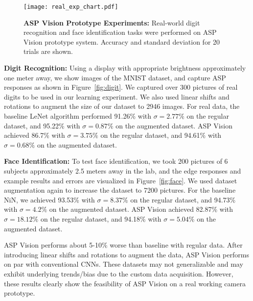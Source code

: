\documentclass[10pt,twocolumn,letterpaper]{article}
\begin{document}
\begin{figure}[t]
\begin{center}
   \texttt{[image: real\_exp\_chart.pdf]}
\end{center}
   \caption{\textbf{ASP Vision Prototype Experiments:} Real-world digit recognition and face identification tasks were performed on ASP Vision prototype system. Accuracy and standard deviation for 20 trials are shown.}
\label{fig:realresults}
\end{figure}\textbf{Digit Recognition:} Using a display with appropriate brightness approximately one meter away, we show images of the MNIST dataset, and capture ASP responses as shown in Figure~\ref{fig:digit}. We captured over 300 pictures of real digits to be used in our learning experiment. We also used linear shifts and rotations to augment the size of our dataset to 2946 images. For real data, the baseline LeNet algorithm performed 91.26\% with $\sigma = 2.77\%$ on the regular dataset, and 95.22\% with $\sigma = 0.87\%$ on the augmented dataset. ASP Vision achieved 86.7\% with $\sigma = 3.75\%$ on the regular dataset, and 94.61\% with $\sigma = 0.68\%$ on the augmented dataset.

\textbf{Face Identification:} To test face identification, we took 200 pictures of 6 subjects approximately 2.5 meters away in the lab, and the edge responses and example results and errors are visualized in Figure~\ref{fig:face}. We used dataset augmentation again to increase the dataset to 7200 pictures. For the baseline NiN, we achieved 93.53\% with $\sigma = 8.37\%$ on the regular dataset, and 94.73\% with $\sigma = 4.2\%$ on the augmented dataset. ASP Vision achieved 82.87\% with $\sigma = 18.12\%$ on the regular dataset, and 94.18\% with $\sigma = 5.04\%$ on the augmented dataset. 

ASP Vision performs about 5-10\% worse than baseline with regular data. After introducing linear shifts and rotations to augment the data, ASP Vision performs on par with conventional CNNs. These datasets may not generalizable and may exhibit underlying trends/bias due to the custom data acquisition. However, these results clearly show the feasibility of ASP Vision on a real working camera prototype. 







\end{document}
